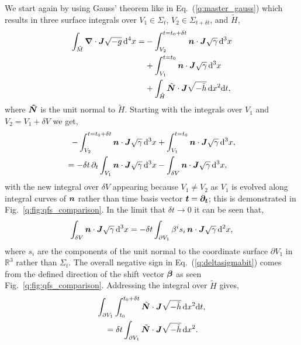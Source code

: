 We start again by using Gauss' theorem like in Eq.~(\ref{q:master_gauss}) which results in three surface integrals over $V_1\in\Sigma_t$, $V_2\in\Sigma_{t+\delta t}$, and $\tilde{H}$,
\begin{align} \begin{split}
\int_{\tilde{M}} \boldsymbol{\nabla} \cdot \boldsymbol{J} \sqrt{-g} \, \dd^4 x =& -\int^{t=t_0+\delta t}_{V_2} \boldsymbol{n} \cdot \boldsymbol{J} \sqrt{\gamma} \,\dd^3 x \\
                                                             & +\int^{t=t_0}_{V_1} \boldsymbol{n} \cdot \boldsymbol{J} \sqrt{\gamma} \,\dd^3 x \\ 
                                                             & +\int_{\tilde{H}} \tilde{\boldsymbol N} \cdot \boldsymbol{J} \sqrt{-\tilde{h}} \, \dd x^2 \dd t,
\end{split}\end{align}
where $\boldsymbol{\tilde{N}}$ is the unit normal to $\tilde{H}$. Starting with the integrals over $V_1$ and $V_2 = V_1 + \delta V$ we get, 
\begin{align}
-\int^{t=t_0+\delta t}_{V_2} \boldsymbol{n} \cdot \boldsymbol{J} \sqrt{\gamma} \,\dd^3 x  &+\int^{t=t_0}_{V_1} \boldsymbol{n} \cdot \boldsymbol{J} \sqrt{\gamma} \,\dd^3 x, \\ 
 \label{q:dsigma dt bit}=-\delta t \,\partial_t \int_{V_1} \boldsymbol{n} \cdot \boldsymbol{J} \sqrt{\gamma} \,\dd^3 x  &-\int_{\delta V} \boldsymbol{n} \cdot \boldsymbol{J} \sqrt{\gamma} \,\dd^3 x, 
\end{align}
with the new integral over $\delta V$ appearing because $V_1\neq V_2$ as $V_1$ is evolved along integral curves of $\boldsymbol{n}$ rather than time basis vector $\boldsymbol{t}=\boldsymbol{\partial_t}$; this is demonstrated in Fig.~\ref{q:fig:qfs_comparison}. In the limit that $\delta t \rightarrow 0$ it can be seen that,
\begin{align} \label{q:deltasigmabit}
\int_{\delta V} \boldsymbol{n} \cdot \boldsymbol{J} \sqrt{\gamma} \,\dd^3 x = -\delta t \int_{\partial V_1} \beta^i s_i\, \boldsymbol{n} \cdot \boldsymbol{J} \sqrt{\gamma} \,\dd^2 x,
\end{align}
where $s_i$ are the components of the unit normal to the coordinate surface $\partial V_1$ in $\mathbb{R}^3$ rather than $\Sigma_t$. The overall negative sign in Eq.~(\ref{q:deltasigmabit}) comes from the defined direction of the shift vector $\boldsymbol{\beta}$ as seen Fig.~\ref{q:fig:qfs_comparison}. Addressing the integral over $\tilde{H}$ gives,  
\begin{align}
 \int_{\partial V_1}\int_{t_0}^{t_0 + \delta t}\tilde{\boldsymbol N} &\cdot \boldsymbol{J} \sqrt{-\tilde{h}} \, \dd x^2 \dd t, \nonumber \\
 \label{q:htildepart}=\delta t \int_{\partial V_1} \tilde{\boldsymbol N} &\cdot \boldsymbol{J} \sqrt{-\tilde{h}} \, \dd x^2.  
\end{align}
